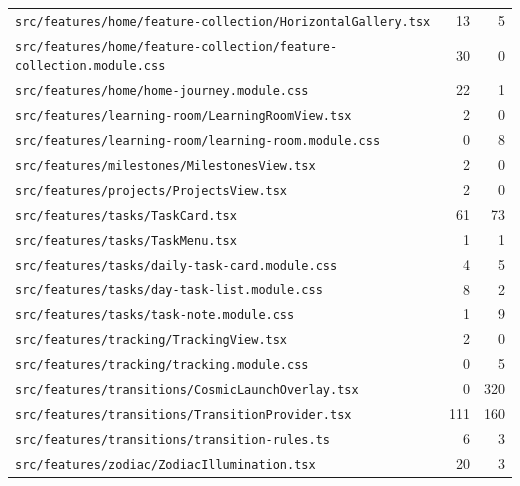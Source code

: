 \begin{longtable}{p{}rr}
\texttt{src/\allowbreak{}features/\allowbreak{}home/\allowbreak{}feature-collection/\allowbreak{}HorizontalGallery.tsx} & 13 & 5 \\
\texttt{src/\allowbreak{}features/\allowbreak{}home/\allowbreak{}feature-collection/\allowbreak{}feature-collection.module.css} & 30 & 0 \\
\texttt{src/\allowbreak{}features/\allowbreak{}home/\allowbreak{}home-journey.module.css} & 22 & 1 \\
\texttt{src/\allowbreak{}features/\allowbreak{}learning-room/\allowbreak{}LearningRoomView.tsx} & 2 & 0 \\
\texttt{src/\allowbreak{}features/\allowbreak{}learning-room/\allowbreak{}learning-room.module.css} & 0 & 8 \\
\texttt{src/\allowbreak{}features/\allowbreak{}milestones/\allowbreak{}MilestonesView.tsx} & 2 & 0 \\
\texttt{src/\allowbreak{}features/\allowbreak{}projects/\allowbreak{}ProjectsView.tsx} & 2 & 0 \\
\texttt{src/\allowbreak{}features/\allowbreak{}tasks/\allowbreak{}TaskCard.tsx} & 61 & 73 \\
\texttt{src/\allowbreak{}features/\allowbreak{}tasks/\allowbreak{}TaskMenu.tsx} & 1 & 1 \\
\texttt{src/\allowbreak{}features/\allowbreak{}tasks/\allowbreak{}daily-task-card.module.css} & 4 & 5 \\
\texttt{src/\allowbreak{}features/\allowbreak{}tasks/\allowbreak{}day-task-list.module.css} & 8 & 2 \\
\texttt{src/\allowbreak{}features/\allowbreak{}tasks/\allowbreak{}task-note.module.css} & 1 & 9 \\
\texttt{src/\allowbreak{}features/\allowbreak{}tracking/\allowbreak{}TrackingView.tsx} & 2 & 0 \\
\texttt{src/\allowbreak{}features/\allowbreak{}tracking/\allowbreak{}tracking.module.css} & 0 & 5 \\
\texttt{src/\allowbreak{}features/\allowbreak{}transitions/\allowbreak{}CosmicLaunchOverlay.tsx} & 0 & 320 \\
\texttt{src/\allowbreak{}features/\allowbreak{}transitions/\allowbreak{}TransitionProvider.tsx} & 111 & 160 \\
\texttt{src/\allowbreak{}features/\allowbreak{}transitions/\allowbreak{}transition-rules.ts} & 6 & 3 \\
\texttt{src/\allowbreak{}features/\allowbreak{}zodiac/\allowbreak{}ZodiacIllumination.tsx} & 20 & 3 \\

\end{longtable}
